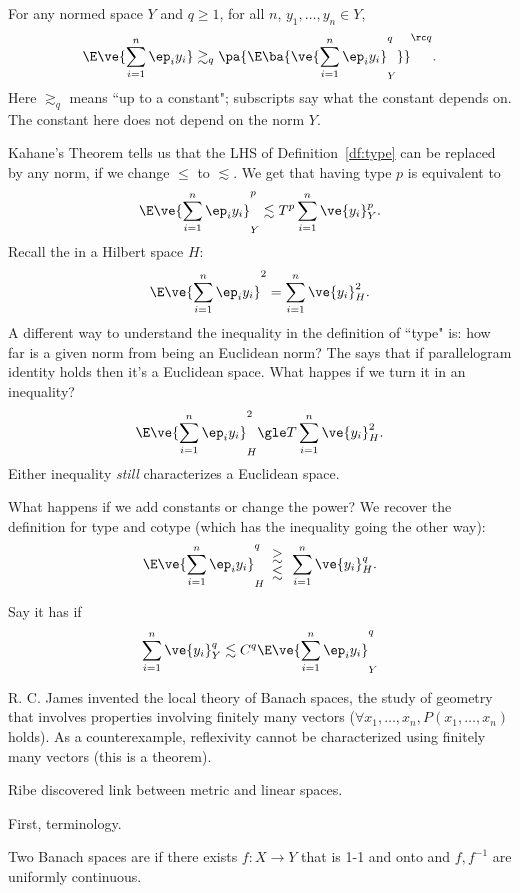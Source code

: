 \begin{thm}
For any normed space $Y$ and $q\ge 1$, for all $n$, $y_1,\ldots, y_n\in Y$,
\[
\E\ve{\sum_{i=1}^n \ep_i y_i}\gtrsim_q \pa{
\E\ba{\ve{\sum_{i=1}^n \ep_i y_i}_Y^q}
}^{\rc q}.
\]
Here $\gtrsim_q$ means ``up to a constant"; subscripts say what the constant depends on. The constant here does not depend on the norm $Y$.
\end{thm}
Kahane's Theorem tells us that the LHS of Definition~\ref{df:type} can be replaced by any norm, if we change $\le$ to $\lesssim$. We get that having type $p$ is equivalent to 
\[
\E\ve{\sum_{i=1}^n \ep_i y_i}_Y^p \lesssim T^p \sum_{i=1}^n \ve{y_i}_Y^p.
\]
Recall the  in a Hilbert space $H$:
\[
\E\ve{\sum_{i=1}^n \ep_i y_i}^2 = \sum_{i=1}^n \ve{y_i}_H^2.
\]
A different way to understand 
the inequality in the definition of ``type" is: how far is a given norm from being an Euclidean norm? 
The  says that if  parallelogram identity holds then it's a Euclidean space. What happes if we turn it in an inequality?
\[
\E\ve{\sum_{i=1}^n \ep_i y_i}_H^2 \gle T\sum_{i=1}^n \ve{y_i}_H^2.
\]
Either inequality \emph{still} characterizes a Euclidean space. 

What happens if we add constants or change the power? We recover the definition for type and cotype (which has the inequality going the other way):
\[
\E\ve{\sum_{i=1}^n \ep_i y_i}_H^q \begin{array}{c}
\gtrsim\\
\lesssim
\end{array} \sum_{i=1}^n \ve{y_i}_H^q.
\]

\begin{df}
Say it has  if
\[
\sum_{i=1}^n \ve{y_i}_Y^q \lesssim C^q \E \ve{\sum_{i=1}^n \ep_i y_i}_Y^q
\]
\end{df}
R. C. James invented the local theory of Banach spaces, the study of geometry that involves properties involving finitely many vectors ($\forall x_1,\ldots, x_n, P(x_1,\ldots, x_n)$ holds). As a counterexample, reflexivity cannot be characterized using finitely many vectors (this is a theorem).

Ribe discovered link between metric and linear spaces.

First, terminology.

\begin{df}
Two Banach spaces are  if there exists $f:X\to Y$ that is 1-1 and onto and $f,f^{-1}$ are uniformly continuous. 
\end{df}

